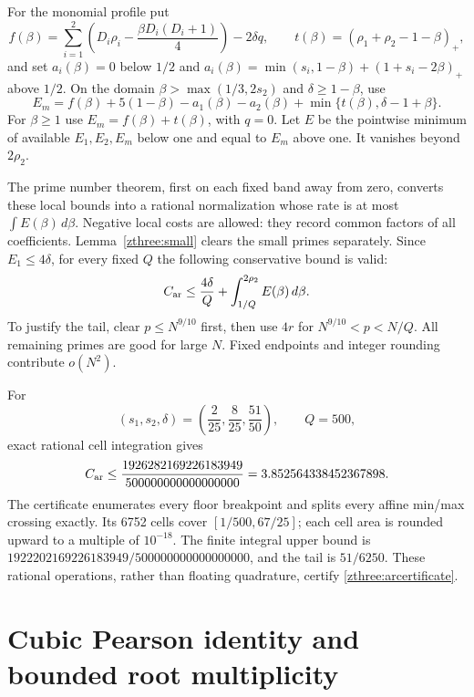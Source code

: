 \documentclass[11pt]{article}
\theoremstyle{definition}\newtheorem{definition}[theorem]{Definition}
\theoremstyle{remark}\newtheorem{remark}[theorem]{Remark}
\begin{document}
For the monomial profile put
\[
 f(\beta)=\sum_{i=1}^2\left(D_i\rho_i-
           \frac{\beta D_i(D_i+1)}4\right)-2\delta q,
 \qquad t(\beta)=(\rho_1+\rho_2-1-\beta)_+,
\]
and set $a_i(\beta)=0$ below $1/2$ and
$a_i(\beta)=\min(s_i,1-\beta)+(1+s_i-2\beta)_+$ above $1/2$.
On the domain $\beta>\max(1/3,2s_2)$ and $\delta\ge1-\beta$, use
\[
 E_m=f(\beta)+5(1-\beta)-a_1(\beta)-a_2(\beta)
                       +\min\{t(\beta),\delta-1+\beta\}.
\]
For $\beta\ge1$ use $E_m=f(\beta)+t(\beta)$, with $q=0$.
Let $E$ be the pointwise minimum of available $E_1,E_2,E_m$ below
one and equal to $E_m$ above one. It vanishes beyond $2\rho_2$.

The prime number theorem, first on each fixed band away from zero,
converts these local bounds into a rational normalization whose rate is
at most $\int E(\beta)\,d\beta$. Negative local costs are allowed:
they record common factors of all coefficients. Lemma~\ref{zthree:small}
clears the small primes separately. Since $E_1\le4\delta$, for every
fixed $Q$ the following conservative bound is valid:
\begin{equation}\label{zthree:car}
 C_{\rm ar}\le\frac{4\delta}{Q}
                +\int_{1/Q}^{2\rho_2}E(\beta)\,d\beta.
\end{equation}
To justify the tail, clear $p\le N^{9/10}$ first, then use $4r$
for $N^{9/10}<p<N/Q$. All remaining primes are good for large $N$.
Fixed endpoints and integer rounding contribute $o(N^2)$.

For
\begin{equation}\label{zthree:parameters}
 (s_1,s_2,\delta)=\left(\frac2{25},\frac8{25},\frac{51}{50}\right),
 \qquad Q=500,
\end{equation}
exact rational cell integration gives
\begin{equation}\label{zthree:arcertificate}
 C_{\rm ar}\le
 \frac{1926282169226183949}{500000000000000000}
 =3.852564338452367898.
\end{equation}
The certificate enumerates every floor breakpoint and splits every
affine min/max crossing exactly. Its 6752 cells cover
$[1/500,67/25]$; each cell area is rounded upward to a multiple of
$10^{-18}$. The finite integral upper bound is
$1922202169226183949/500000000000000000$, and the tail is $51/6250$.
These rational operations, rather than floating quadrature, certify
\eqref{zthree:arcertificate}.

\section{Cubic Pearson identity and bounded root multiplicity}
\label{zthree:nullity}
\end{document}
